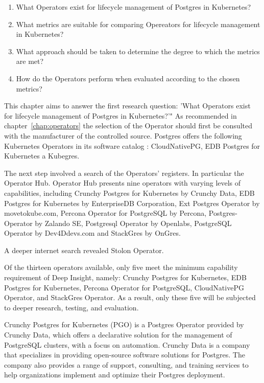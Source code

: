 \begin{enumerate}
    \item What Operators exist for lifecycle management of Postgres in Kubernetes?
    \item What metrics are suitable for comparing Opereators for lifecycle management in Kubernetes?
    \item What approach should be taken to determine the degree to which the metrics are met?
    \item How do the Operators perform when evaluated according to the chosen metrics?
\end{enumerate}

\label{chap:searchForOperators}
This chapter aims to answer the first research question: 'What Operators exist for lifecycle management of Postgres in Kubernetes?'"
As recommended in chapter~\ref{chap:operators} the selection of the Operator should first be consulted with the manufacturer of the controlled source. Postgres offers the following Kubernetes Operators in its software catalog \cite{docuPgSwCatalogue}: CloudNativePG, EDB Postgres for Kubernetes a Kubegres.

The next step involved a search of the Operators' registers. In particular the Operator Hub. \cite{OperatorHubPGSearch} Operator Hub presents nine operators with varying levels of capabilities, including Crunchy Postgres for Kubernetes by Crunchy Data, EDB Postgres for Kubernetes by EnterpriseDB Corporation, Ext Postgres Operator by movetokube.com, Percona Operator for PostgreSQL by Percona, Postgres-Operator by Zalando SE, Postgresql Operator by Openlabs, PostgreSQL Operator by Dev4Ddevs.com and StackGres by OnGres.

A deeper internet search revealed Stolon Operator. \cite{PalarkComparingKubernetes}

Of the thirteen operators available, only five meet the minimum capability requirement of Deep Insight, namely: Crunchy Postgres for Kubernetes, EDB Postgres for Kubernetes, Percona Operator for PostgreSQL, CloudNativePG Operator, and StackGres Operator. As a result, only these five will be subjected to deeper research, testing, and evaluation.

\pagebreak
{}
Crunchy Postgres for Kubernetes (PGO) is a Postgres Operator provided by Crunchy Data, which offers a declarative solution for the management of PostgreSQL clusters, with a focus on automation.
Crunchy Data is a company that specializes in providing open-source software solutions for Postgres. The company also provides a range of support, consulting, and training services to help organizations implement and optimize their Postgres deployment. \cite{Crunchy}

